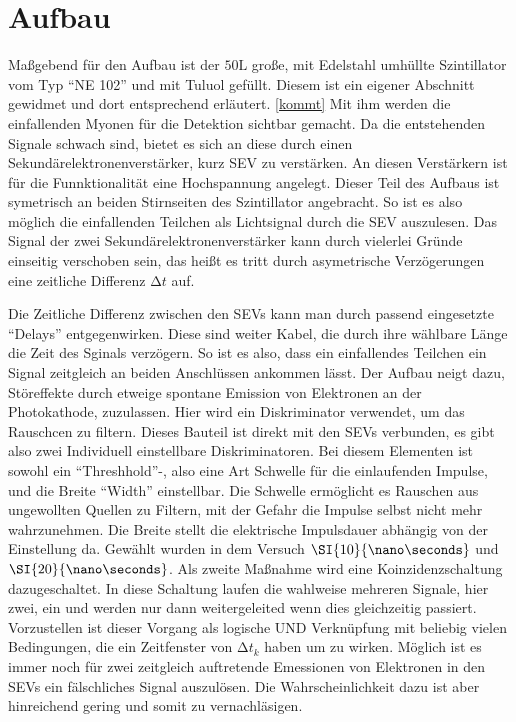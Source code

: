 \section{Aufbau}

\begin{minipage}{0.5\textwidth}
Maßgebend für den Aufbau ist der $50 \si{\liter}$ große, mit Edelstahl umhüllte Szintillator vom Typ \enquote{NE 102} und mit Tuluol gefüllt. Diesem ist ein eigener Abschnitt gewidmet und dort entsprechend erläutert. \ref{kommt}
Mit ihm werden die einfallenden Myonen für die Detektion sichtbar gemacht. Da die entstehenden Signale schwach sind, bietet es sich an diese durch einen Sekundärelektronenverstärker, kurz SEV zu verstärken. An diesen Verstärkern ist für
die Funnktionalität eine Hochspannung angelegt. Dieser Teil des Aufbaus ist symetrisch an beiden Stirnseiten des Szintillator angebracht. So ist es also möglich die einfallenden Teilchen als Lichtsignal durch die SEV auszulesen.
Das Signal der zwei Sekundärelektronenverstärker kann durch vielerlei Gründe einseitig verschoben sein, das heißt es tritt durch asymetrische Verzögerungen eine zeitliche Differenz $\increment t$ auf.
\end{minipage}
Die Zeitliche Differenz zwischen den SEVs kann man durch passend eingesetzte \enquote{Delays} entgegenwirken. Diese sind weiter Kabel, 
die durch ihre wählbare Länge die Zeit des Sginals verzögern. So ist es also, dass ein einfallendes Teilchen ein Signal zeitgleich an beiden Anschlüssen ankommen lässt.
Der Aufbau neigt dazu, Störeffekte durch etweige spontane Emission von Elektronen an der Photokathode, zuzulassen. Hier wird ein Diskriminator verwendet, um das Rauschcen zu filtern.
Dieses Bauteil ist direkt mit den SEVs verbunden, es gibt also zwei Individuell einstellbare Diskriminatoren. Bei diesem Elementen ist sowohl
ein \enquote{Threshhold}-, also eine Art Schwelle für die einlaufenden Impulse, und die Breite \enquote{Width} einstellbar.
Die Schwelle ermöglicht es Rauschen aus ungewollten Quellen zu Filtern, mit der Gefahr die Impulse selbst nicht mehr wahrzunehmen. 
Die Breite stellt die elektrische Impulsdauer abhängig von der Einstellung da. Gewählt wurden in dem Versuch $\SI{10}{\nano\seconds}$ und $\SI{20}{\nano\seconds}$.
Als zweite Maßnahme wird eine Koinzidenzschaltung dazugeschaltet. In diese Schaltung laufen die wahlweise mehreren Signale, hier zwei, ein und werden nur dann weitergeleited wenn dies gleichzeitig passiert.
Vorzustellen ist dieser Vorgang als logische UND Verknüpfung mit beliebig vielen Bedingungen, die ein Zeitfenster von $\increment t_k$ haben um zu wirken. 
Möglich ist es immer noch für zwei zeitgleich auftretende Emessionen von Elektronen in den SEVs ein fälschliches Signal auszulösen. Die Wahrscheinlichkeit dazu ist aber hinreichend gering
und somit zu vernachläsigen.










